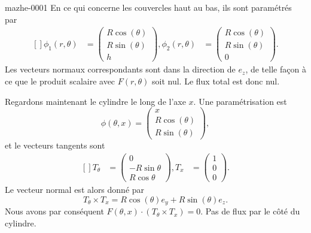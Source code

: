 \begin{corrige}{mazhe-0001}
    En ce qui concerne les couvercles haut au bas, ils sont paramétrés par
    \begin{equation}
        \begin{aligned}[]
            \phi_1(r,\theta)&=\begin{pmatrix}
                R\cos(\theta)    \\ 
                R\sin(\theta)    \\ 
                h    
            \end{pmatrix},
            \phi_2(r,\theta)&=\begin{pmatrix}
                R\cos(\theta)    \\ 
                R\sin(\theta)    \\ 
                0    
            \end{pmatrix}.
        \end{aligned}
    \end{equation}
    Les vecteurs normaux correspondants sont dans la direction de $e_z$, de telle façon à ce que le produit scalaire avec $F(r,\theta)$ soit nul. Le flux total est donc nul.

    Regardons maintenant le cylindre le long de l'axe $x$. Une paramétrisation est
    \begin{equation}
        \phi(\theta,x)=\begin{pmatrix}
            x    \\ 
            R\cos(\theta)    \\ 
            R\sin(\theta)    
        \end{pmatrix},
    \end{equation}
    et le vecteurs tangents sont
    \begin{equation}
        \begin{aligned}[]
            T_{\theta}&=\begin{pmatrix}
                0    \\ 
                -R\sin\theta    \\ 
                R\cos\theta    
            \end{pmatrix},
            T_x&=\begin{pmatrix}
                1    \\ 
                0    \\ 
                0    
            \end{pmatrix}.
        \end{aligned}
    \end{equation}
    Le vecteur normal est alors donné par
    \begin{equation}
        T_{\theta}\times T_x=R\cos(\theta)e_y+R\sin(\theta)e_z.
    \end{equation}
    Nous avons par conséquent $F(\theta,x)\cdot (T_{\theta}\times T_x)=0$. Pas de flux par le côté du cylindre.


\end{corrige}
